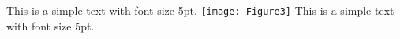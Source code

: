 \documentclass[a4paper]{article}
\begin{document}
    \noindent %
    \thispagestyle{empty} %
    \begin{center} %
        \vspace*{\fill} %
        {\fontsize{5pt}{6pt}\selectfont This is a simple text with font size 5pt.}
        \texttt{[image: Figure3]} %
        \captionsetup{} %
        {\fontsize{5pt}{5pt}\selectfont This is a simple text with font size 5pt.} %
        \vspace*{\fill} %
    \end{center}
\end{document}
